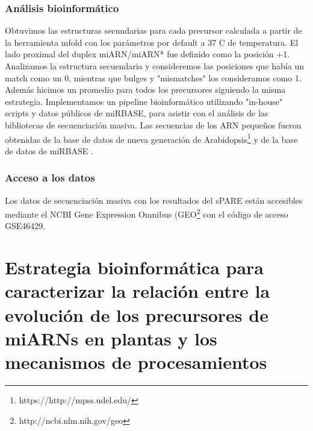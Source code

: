 \subsubsection{Análisis bioinformático}

Obtuvimos las estructuras secundarias para cada precursor calculada a partir de la herramienta mfold \citep{pmid12824337} con los parámetros por default a 37 \degree C de temperatura.
El lado proximal del duplex miARN/miARN* fue definido como la posición +1.
Analizamos la estructura secuendaria y consideremos las posiciones que había un match como un 0, mientras que bulges y "mismatches" los consideramos como 1.
Además hicimos un promedio para todos los precursores siguiendo la misma estrategia.
Implementamos un pipeline bioinformático utilizando "in-house" scripts y datos públicos de miRBASE, para asistir con el análisis de las bibliotecas de secuenciación masiva.
Las secuencias de los ARN pequeños fueron obtenidas de la base de datos de nueva generación de Arabidopsis\footnote{https://http://mpss.udel.edu/} \citep{pmid25120269} y  de la base de datos de miRBASE \citep{Kozomara2014}.

\subsubsection{Acceso a los datos}
Los datos de secuenciación masiva con los resultados del sPARE están accesibles mediante el NCBI Gene Expression Omnibus (GEO\footnote{http://ncbi.nlm.nih.gov/geo} con el código de acceso GSE46429.

\section{Estrategia bioinformática para caracterizar la relación entre la evolución de los precursores de miARNs en plantas y los mecanismos de procesamientos} \label{ref_evolution}

